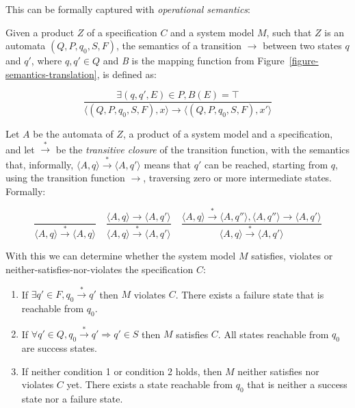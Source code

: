 This can be formally captured with \textit{operational semantics}:


\begin{mydef}
Given a product $Z$ of a specification $C$ and a system model $M$, such that
$Z$ is an automata $(Q, P, q_0, S, F)$, the semantics of a transition
$\rightarrow$ between two states $q$ and $q'$, where $q,q' \in Q$ and
\textit{B} is the mapping function from
Figure~\ref{figure-semantics-translation}, is defined as:

\medskip
\[
  \frac{\exists (q, q', E) \in P, \textit{B}(E) = \top}
  {\langle(Q, P, q_0, S, F), x\rangle \rightarrow \langle(Q, P, q_0, S, F), x'\rangle}
\]
\medskip
\end{mydef}

\begin{mydef}
Let $A$ be the automata of $Z$, a product of a system model and a
specification, and let $\xrightarrow*$ be the \textit{transitive closure} of
the transition function, with the semantics that, informally, $\langle A,
q\rangle \xrightarrow* \langle A, q'\rangle$ means that $q'$ can be reached,
starting from $q$, using the transition function $\rightarrow$, traversing zero
or more intermediate states. Formally:

\medskip
\[
  \frac{}
  {\langle A, q\rangle \xrightarrow* \langle A, q\rangle}
  \quad
  \frac{\langle A, q\rangle \rightarrow \langle A, q'\rangle}
  {\langle A, q\rangle \xrightarrow* \langle A, q'\rangle}
  \quad
  \frac{\langle A, q\rangle \xrightarrow* \langle A, q''\rangle, \langle A, q''\rangle \rightarrow \langle A, q'\rangle}
  {\langle A, q\rangle \xrightarrow* \langle A, q'\rangle}
\]
\medskip
\end{mydef}

\begin{mydef}

With this we can determine whether the system model $M$ satisfies, violates or
neither-satisfies-nor-violates the specification $C$:

\begin{enumerate}
  \item If $\exists q' \in F, q_0 \xrightarrow* q'$ then $M$ violates $C$.
    There exists a failure state that is reachable from $q_0$.
  \item If $\forall q' \in Q, q_0 \xrightarrow* q' \Rightarrow q' \in S$ then
    $M$ satisfies $C$. All states reachable from $q_0$ are success states.
  \item If neither condition 1 or condition 2 holds, then $M$ neither satisfies
    nor violates $C$ yet. There exists a state reachable from $q_0$ that is
    neither a success state nor a failure state.
\end{enumerate}

\end{mydef}

